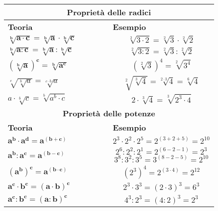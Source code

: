 \documentclass[14pt]{extarticle}
\begin{document}
\begin{table}
    \begin{tabular}{|m{0.5\linewidth}|m{0.5\linewidth}|}
        \hline
        \multicolumn{2}{|c|}{\large{\textbf{Proprietà delle radici}}}\\
        \hline
        \hline
        \textbf{Teoria} & \textbf{Esempio }\\
        \hline
        \( \mathbf{\sqrt[b]{a\cdot c}=\sqrt[b]{a}\cdot\sqrt[b]{c}}\) & \[\sqrt[2]{3\cdot 2}=\sqrt[2]{3}\cdot\sqrt[2]{2}\]\\
        \hline
        \(\mathbf{\sqrt[b]{a:c}=\sqrt[b]{a}:\sqrt[b]{c}}\) & \[\sqrt[2]{3: 2}=\sqrt[2]{3}:\sqrt[2]{2}\]\\
        \hline
        \(\mathbf{(\sqrt[b]{a})^c=\sqrt[b]{a^c}}\) & \[(\sqrt[2]{3})^4=\sqrt[2]{3^4}\]\\
        \hline
        \(\sqrt[c]{\sqrt[b]{a}}=\sqrt[c\cdot b]{a}\) & \[\sqrt[2]{\sqrt[3]{4}}=\sqrt[2\cdot 3]{4}=\sqrt[6]{4}\]\\
        \hline
        \(a\cdot\sqrt[b]{c}=\sqrt[b]{a^b\cdot c}\)& \[2\cdot\sqrt[3]{4}=\sqrt[3]{2^3\cdot 4}\] \\
        \hline
        \hline
        \multicolumn{2}{|c|}{\large{\textbf{Proprietà delle potenze}}}\\
        \hline
        \hline
        \textbf{Teoria} & \textbf{Esempio }\\
        \hline
        \(\mathbf{a^b\cdot a^d= a^{(b+c)}}\)& \[2^3\cdot2^2\cdot2^5=2^{(3+2+5)}=2^{10}\]\\
        \hline
        \vspace{2mm}
        \(\mathbf{a^b:a^c= a^{(b-c)}}\) & \[2^6:2^2:2^1=2^{(6-2-1)}=2^{3}  \]  \[3^8:3^2:3^5=3^{(8-2-5)}=2^{10} \]\\
        \hline
        \(\mathbf{(a^b)^c=a^{(b\cdot c)}} \) & \[(2^3)^4=2^{(3\cdot 4)}=2^{12}\] \\  
        \hline
        \(\mathbf{a^c\cdot b^c=(a\cdot b)^c}\) & \[2^3\cdot 3^3=(2\cdot 3)^3=6^3\]\\ \hline
        \(\mathbf{a^c: b^c=(a: b)^c}\) & \[4^3:2^3=(4:2)^3=2^3\]\\ 
        \hline
        \hline
        \end{tabular}

\end{table}
         
\end{document}
